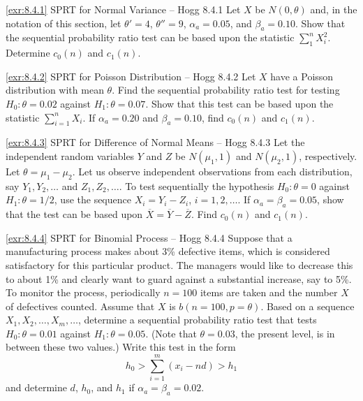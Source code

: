 \begin{exercise}{\ref{exr:8.4.1} SPRT for Normal Variance -- Hogg 8.4.1}\label{exr:8.4.1}
Let $X$ be $N(0, \theta)$ and, in the notation of this section, let $\theta' = 4$, $\theta'' = 9$, $\alpha_a = 0.05$, and $\beta_a = 0.10$. Show that the sequential probability ratio test can be based upon the statistic $\sum_{1}^n X_i^2$. Determine $c_0(n)$ and $c_1(n)$.
\end{exercise}

\begin{exercise}{\ref{exr:8.4.2} SPRT for Poisson Distribution -- Hogg 8.4.2}\label{exr:8.4.2}
Let $X$ have a Poisson distribution with mean $\theta$. Find the sequential probability ratio test for testing $H_0: \theta = 0.02$ against $H_1: \theta = 0.07$. Show that this test can be based upon the statistic $\sum_{i=1}^n X_i$. If $\alpha_a = 0.20$ and $\beta_a = 0.10$, find $c_0(n)$ and $c_1(n)$.
\end{exercise}

\begin{exercise}{\ref{exr:8.4.3} SPRT for Difference of Normal Means -- Hogg 8.4.3}\label{exr:8.4.3}
Let the independent random variables $Y$ and $Z$ be $N(\mu_1, 1)$ and $N(\mu_2, 1)$, respectively. Let $\theta = \mu_1 - \mu_2$. Let us observe independent observations from each distribution, say $Y_1, Y_2, \ldots$ and $Z_1, Z_2, \ldots$. To test sequentially the hypothesis $H_0: \theta = 0$ against $H_1: \theta = 1/2$, use the sequence $X_i = Y_i - Z_i$, $i = 1, 2, \ldots$. If $\alpha_a = \beta_a = 0.05$, show that the test can be based upon $\overline{X} = \overline{Y} - \overline{Z}$. Find $c_0(n)$ and $c_1(n)$.
\end{exercise}

\begin{exercise}{\ref{exr:8.4.4} SPRT for Binomial Process -- Hogg 8.4.4}\label{exr:8.4.4}
Suppose that a manufacturing process makes about 3\% defective items, which is considered satisfactory for this particular product. The managers would like to decrease this to about 1\% and clearly want to guard against a substantial increase, say to 5\%. To monitor the process, periodically $n = 100$ items are taken and the number $X$ of defectives counted. Assume that $X$ is $b(n = 100, p = \theta)$. Based on a sequence $X_1, X_2, \ldots, X_m, \ldots$, determine a sequential probability ratio test that tests $H_0: \theta = 0.01$ against $H_1: \theta = 0.05$. (Note that $\theta = 0.03$, the present level, is in between these two values.) Write this test in the form
\[
h_0 > \sum_{i=1}^m (x_i - nd) > h_1
\]
and determine $d$, $h_0$, and $h_1$ if $\alpha_a = \beta_a = 0.02$.
\end{exercise}

